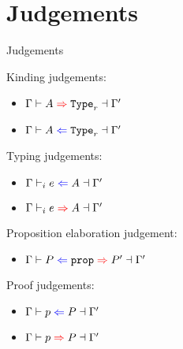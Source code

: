 \section{Judgements}

\begin{frame}{Judgements}

Kinding judgements:
\begin{itemize}
  \item $\inferkind{\Gamma}{A}[r]{\Gamma'}$
  \item $\checkkind{\Gamma}{A}[r]{\Gamma'}$
\end{itemize}

\vspace{1em}

Typing judgements:
\begin{itemize}
  \item $\checktype{\Gamma}{e}{A}{\Gamma'}$
  \item $\infertype{\Gamma}{e}{A}{\Gamma'}$
\end{itemize}

\vspace{1em}

Proposition elaboration judgement:
\begin{itemize}
  \item $\checkprop{\Gamma}{P}{P'}{\Gamma'}$
\end{itemize}

\vspace{1em}

Proof judgements:
\begin{itemize}
  \item $\checkproof{\Gamma}{p}{P}{\Gamma'}$
  \item $\inferproof{\Gamma}{p}{P}{\Gamma'}$
\end{itemize}

\end{frame}

